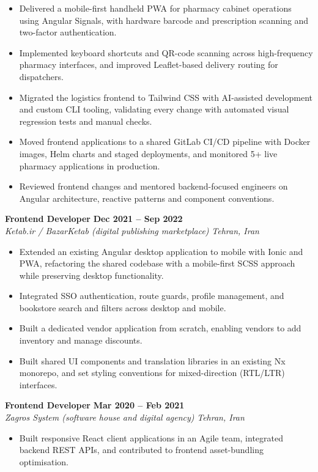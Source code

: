 \documentclass[a4paper,10pt]{article}
\newcommand{\jobheader}[4]{%
  \textbf{#1} \hfill \textbf{#2} \\%
  \textit{\color{primarycolor}#3} \hfill \textit{#4}\\%
}
\newenvironment{tightitems}{\begin{itemize}[leftmargin=12pt, itemsep=1pt, parsep=0pt, topsep=2pt]}{\end{itemize}}
\begin{document}
\begin{tightitems}
    \item Delivered a mobile-first handheld PWA for pharmacy cabinet operations using Angular Signals, with hardware barcode and prescription scanning and two-factor authentication.
    \item Implemented keyboard shortcuts and QR-code scanning across high-frequency pharmacy interfaces, and improved Leaflet-based delivery routing for dispatchers.
    \item Migrated the logistics frontend to Tailwind CSS with AI-assisted development and custom CLI tooling, validating every change with automated visual regression tests and manual checks.
    \item Moved frontend applications to a shared GitLab CI/CD pipeline with Docker images, Helm charts and staged deployments, and monitored 5+ live pharmacy applications in production.
    \item Reviewed frontend changes and mentored backend-focused engineers on Angular architecture, reactive patterns and component conventions.
\end{tightitems}

\vspace{3pt}
\jobheader{Frontend Developer}{Dec 2021 -- Sep 2022}{Ketab.ir / BazarKetab (digital publishing marketplace)}{Tehran, Iran}
\begin{tightitems}
    \item Extended an existing Angular desktop application to mobile with Ionic and PWA, refactoring the shared codebase with a mobile-first SCSS approach while preserving desktop functionality.
    \item Integrated SSO authentication, route guards, profile management, and bookstore search and filters across desktop and mobile.
    \item Built a dedicated vendor application from scratch, enabling vendors to add inventory and manage discounts.
    \item Built shared UI components and translation libraries in an existing Nx monorepo, and set styling conventions for mixed-direction (RTL/LTR) interfaces.
\end{tightitems}

\vspace{3pt}
\jobheader{Frontend Developer}{Mar 2020 -- Feb 2021}{Zagros System (software house and digital agency)}{Tehran, Iran}
\begin{tightitems}
    \item Built responsive React client applications in an Agile team, integrated backend REST APIs, and contributed to frontend asset-bundling optimisation.
\end{tightitems}
\end{document}
